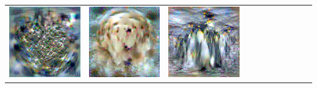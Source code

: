 \documentclass[main.tex]{subfiles}
\begin{document}
{\begin{center}
\begin{tabular}{ccccccccccc}
    \includegraphics[align=c,width=\coverwidth\linewidth]{figures/cover/imagenet/french_horn_0.pdf} &
    \includegraphics[align=c,width=\coverwidth\linewidth]{figures/cover/imagenet/golden_retriever_0.pdf} &
    \includegraphics[align=c,width=\coverwidth\linewidth]{figures/cover/imagenet/king_penguin_0.pdf} &

\end{tabular}
\end{center}}
\end{document}
